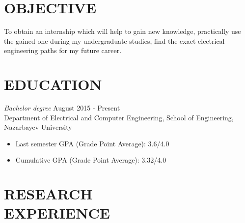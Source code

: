 \documentclass[margin, 10pt]{res} %
\begin{document}
\begin{resume}

 
\section{OBJECTIVE}  

To obtain an internship which will help to gain new knowledge, practically use the gained one during my undergraduate studies, find the exact electrical engineering paths for my future career.


\section{EDUCATION}

{\sl Bachelor degree} \hfill August 2015 - Present \\
Department of Electrical and Computer Engineering, School of Engineering, Nazarbayev University
\begin{itemize}
\item Last semester GPA (Grade Point Average): 3.6/4.0
\item Cumulative GPA (Grade Point Average): 3.32/4.0
\end{itemize} 


 
\section{RESEARCH \\ EXPERIENCE}



\end{resume}
\end{document}
